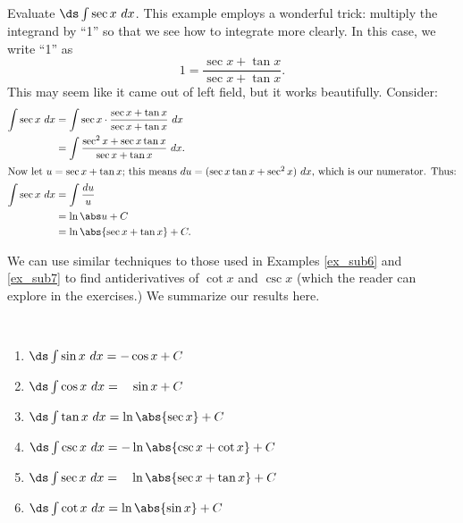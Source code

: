 \begin{example}\label{ex_sub7}
Evaluate $\ds\int \sec x\ dx$.
\solution
This example employs a wonderful trick: multiply the integrand by ``1'' so that we see how to integrate more clearly. In this case, we write ``1'' as
\[1 = \frac{\sec x + \tan x}{\sec x + \tan x}.\]
This may seem like it came out of left field, but it works beautifully. Consider:
\begin{align*}
	\int \sec x\ dx
	&= \int \sec x\cdot \frac{\sec x + \tan x}{\sec x + \tan x}\ dx \\
	&= \int \frac{\sec^2 x + \sec x\tan x}{\sec x + \tan x}\ dx.\\
\intertext{Now let $u = \sec x+\tan x$; this means $du = (\sec x\tan x+ \sec^2 x)\ dx$, which is our numerator. Thus:}
	\int \sec x\ dx
	&= \int \frac{du}{u} \\
	&= \ln \abs u + C \\
	&= \ln \abs{\sec x+\tan x} + C.
\end{align*}
\end{example}

We can use similar techniques to those used in Examples \ref{ex_sub6} and \ref{ex_sub7} to find antiderivatives of $\cot x$ and $\csc x$ (which the reader can explore in the exercises.) We summarize our results here.

{%
\begin{theorem}\label{thm:triganti}
\mbox{}\\[-2\baselineskip]\parbox[t]{\linewidth}{%
\begin{multicols}{2}\small
	\begin{enumerate}
	\item	$\ds \int \sin x \ dx = -\cos x +C$
	\item	$\ds\int \cos x\ dx = \phantom{-}\sin x + C$
	\item	$\ds \int \tan x\ dx = \ln\abs{\sec x}+C$
	\item	$\ds \int \csc x \ dx = -\ln\abs{\csc x+\cot x} +C$
	\item	$\ds\int \sec x\ dx = \phantom{-}\ln\abs{\sec x+\tan x} + C$
	\item	$\ds \int \cot x\ dx = \ln\abs{\sin x}+C$
\end{enumerate}
\end{multicols}}
\end{theorem}%
}


